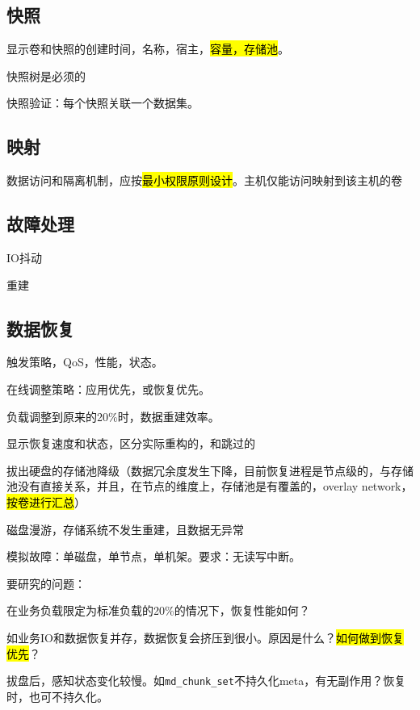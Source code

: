 \subsection{快照}

\begin{enumbox}
\item 显示卷和快照的创建时间，名称，宿主，\hl{容量，存储池}。
\item 快照树是必须的
\item 快照验证：每个快照关联一个数据集。
\end{enumbox}

\subsection{映射}

数据访问和隔离机制，应按\hl{最小权限原则设计}。主机仅能访问映射到该主机的卷

\subsection{故障处理}

\begin{enumbox}
\item IO抖动
\item 重建
\end{enumbox}

\subsection{数据恢复}

触发策略，QoS，性能，状态。

\begin{enumbox}
\item 在线调整策略：应用优先，或恢复优先。
\item 负载调整到原来的20\%时，数据重建效率。
\item 显示恢复速度和状态，区分实际重构的，和跳过的
\item 拔出硬盘的存储池降级（数据冗余度发生下降，目前恢复进程是节点级的，与存储池没有直接关系，并且，在节点的维度上，存储池是有覆盖的，overlay network，\hl{按卷进行汇总}）
\item 磁盘漫游，存储系统不发生重建，且数据无异常
\item 模拟故障：单磁盘，单节点，单机架。要求：无读写中断。
\end{enumbox}

要研究的问题：
\begin{enumbox}
\item 在业务负载限定为标准负载的20\%的情况下，恢复性能如何？
\item 如业务IO和数据恢复并存，数据恢复会挤压到很小。原因是什么？\hl{如何做到恢复优先}？
\item 拔盘后，感知状态变化较慢。如\verb|md_chunk_set|不持久化meta，有无副作用？恢复时，也可不持久化。
\end{enumbox}

